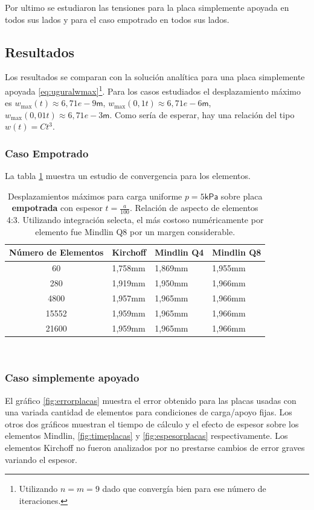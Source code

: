 \documentclass[onecolumn,10pt,titlepage]{article}
\newcommand{\unit}[1]{\textsf{#1}}
\newcommand{\milli}{\unit{m}}
\newcommand{\meter}{\unit{m}}
\newcommand{\pascal}{\unit{Pa}}
\newcommand{\kilo}{\unit{k}}
\newcommand{\si}[1]{#1}
\newcommand{\SI}[2]{#1\si{#2}}
\begin{document}
Por ultimo se estudiaron las tensiones para la placa simplemente apoyada en todos sus lados y para el caso empotrado en todos sus lados.

\subsection{Resultados}
Los resultados se comparan con la solución analítica para una placa simplemente apoyada \eqref{eq:uguralwmax}\footnote{Utilizando $n=m=9$ dado que convergía bien para ese número de iteraciones.}. Para los casos estudiados el desplazamiento máximo es $w_{\max}(t)\approx \SI{6,71e-9}{\meter}$, $w_{\max}(0,1t)\approx \SI{6,71e-6}{\meter}$, $w_{\max}(0,01t)\approx \SI{6,71e-3}{\meter}$. Como sería de esperar, hay una relación del tipo $w(t)=Ct^3$.
\subsubsection*{Caso Empotrado}
La tabla \ref{tab:Convergencia} muestra un estudio de convergencia para los elementos. 
\begin{table}[htb!] 
	\centering
	\begin{tabular}{clll}
		Número de Elementos& Kirchoff & Mindlin Q4 & Mindlin Q8  \\ \hline
		60  & \SI{1,758}{\milli \meter}  &  \SI{1,869}{\milli \meter}  & \SI{1,955}{\milli \meter} \\
		280  & \SI{1,919}{\milli \meter}  &  \SI{1,950}{\milli \meter}  & \SI{1,966}{\milli \meter} \\
		4800 &\SI{1,957}{\milli \meter}  &   \SI{1,965}{\milli \meter} &\SI{1,966}{\milli \meter} \\
		15552 &  \SI{1,959}{\milli \meter}   &  \SI{1,965}{\milli \meter}  & \SI{1,966}{\milli \meter}\\
		21600&  \SI{1,959}{\milli \meter}& \SI{1,965}{\milli \meter}  & \SI{1,966}{\milli \meter}
	\end{tabular}\
	\caption{Desplazamientos máximos para carga uniforme $p=\SI{5}{\kilo \pascal}$ sobre placa \textbf{empotrada} con espesor $t=\frac{a}{100}$. Relación de aspecto de elementos 4:3. Utilizando integración selecta\citep{cook2007concepts}, el más costoso numéricamente por elemento fue Mindlin Q8 por un margen considerable.}
	\label{tab:Convergencia}
\end{table}

\subsubsection*{Caso simplemente apoyado}
El gráfico \ref{fig:errorplacas} muestra el error obtenido para las placas usadas con una variada cantidad de elementos para condiciones de carga/apoyo fijas. Los otros dos gráficos muestran el tiempo de cálculo y el efecto de espesor sobre los elementos Mindlin, \ref{fig:timeplacas} y \ref{fig:espesorplacas} respectivamente. Los elementos Kirchoff no fueron analizados por no prestarse cambios de error graves variando el espesor.
\end{document}
